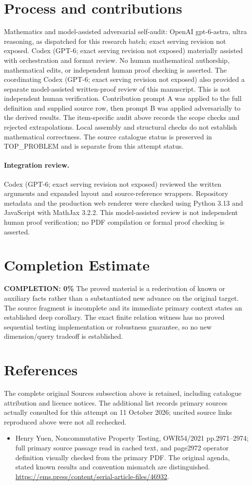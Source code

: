 \documentclass[11pt]{article}
\begin{document}
\section{Process and contributions}
Mathematics and model-assisted adversarial self-audit: OpenAI gpt-6-astra, ultra reasoning, as dispatched for this research batch; exact serving revision not exposed. Codex (GPT-6; exact serving revision not exposed) materially assisted with orchestration and format review. No human mathematical authorship, mathematical edits, or independent human proof checking is asserted.
The coordinating Codex (GPT-6; exact serving revision not exposed) also provided a separate model-assisted written-proof review of this manuscript. This is not independent human verification.
Contribution prompt A was applied to the full definition and supplied source row, then prompt B was applied adversarially to the derived results. The item-specific audit above records the scope checks and rejected extrapolations. Local assembly and structural checks do not establish mathematical correctness. The source catalogue status is preserved in TOP\_PROBLEM and is separate from this attempt status.
\paragraph{Integration review.} Codex (GPT-6; exact serving revision not exposed) reviewed the written arguments and expanded layout and source-reference wrappers. Repository metadata and the production web renderer were checked using Python 3.13 and JavaScript with MathJax 3.2.2. This model-assisted review is not independent human proof verification; no PDF compilation or formal proof checking is asserted.

\section{Completion Estimate}
\noindent\textbf{COMPLETION: 0\%}
The proved material is a rederivation of known or auxiliary facts rather than a substantiated new advance on the original target. The source fragment is incomplete and its immediate primary context states an established deep corollary. The exact finite relation witness has no proved sequential testing implementation or robustness guarantee, so no new dimension/query tradeoff is established.
\section{References}
The complete original Sources subsection above is retained, including catalogue attribution and licence notices. The additional list records primary sources actually consulted for this attempt on 11 October 2026; uncited source links reproduced above were not all rechecked.
\begin{itemize}
\item Henry Yuen, Noncommutative Property Testing, OWR54/2021 pp.2971–2974; full primary source passage read in cached text, and page2972 operator definition visually checked from the primary PDF. The original agenda, stated known results and convention mismatch are distinguished. \url{https://ems.press/content/serial-article-files/46932}.
\end{itemize}
\end{document}
